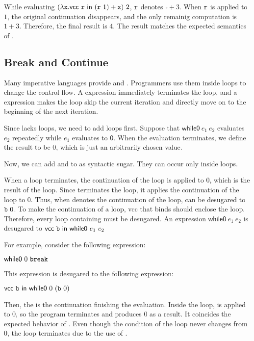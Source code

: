 While evaluating $(\lambda \texttt{x}.\textsf{vcc}\ \texttt{r}\ \textsf{in}\ (\texttt{r}\ 1)+\texttt{x})\ 2$,
$\texttt{r}$ denotes $\square+3$. When $\texttt{r}$ is applied to $1$,
the original continuation disappears, and the only remainig computation is
$1+3$. Therefore, the final result is $4$. The result matches the expected
semantics of .

\subsection{Break and Continue}

Many imperative languages provide  and . Programmers
use them inside loops to change the control flow. A  expression
immediately terminates the loop, and a  expression makes the
loop skip the current iteration and directly move on to the beginning of the
next iteration.

Since \lang lacks loops, we need to add loops first.
Suppose that $\textsf{while0}\ e_1\ e_2$ evaluates $e_2$ repeatedly while $e_1$
evaluates to $\textsf{0}$. When the evaluation terminates, we define the result
to be $0$, which is just an arbitrarily chosen value.

Now, we can add  and  to \lang as syntactic
sugar. They can occur only inside loops.

When a loop terminates, the continuation of the loop is applied to $0$, which is
the result of the loop. Since  terminates the loop, it
applies the continuation of the loop to $0$. Thus, when  denotes the
continuation of the loop,  can be desugared to $\texttt{b}\ 0$.
To make  the continuation of a loop, \textsf{vcc} that binds 
should enclose the loop. Therefore, every loop containing  must be
desugared. An expression $\textsf{while0}\ e_1\ e_2$ is desugared to
$\evcc{\code{b}}{\textsf{while0}\ e_1\ e_2}$

For example, consider the following expression:

$\textsf{while0}\ 0\ \code{break}$

This expression is desugared to the following expression:

$\evcc{\code{b}}{\textsf{while0}\ 0\ (\code{b}\ 0)}$

Then, the  is the continuation finishing the evaluation.
Inside the loop,  is applied to $0$, so the program terminates and
produces $0$ as a result. It coincides the expected behavior of .
Even though the condition of the loop never changes from $0$, the loop
terminates due to the use of .

